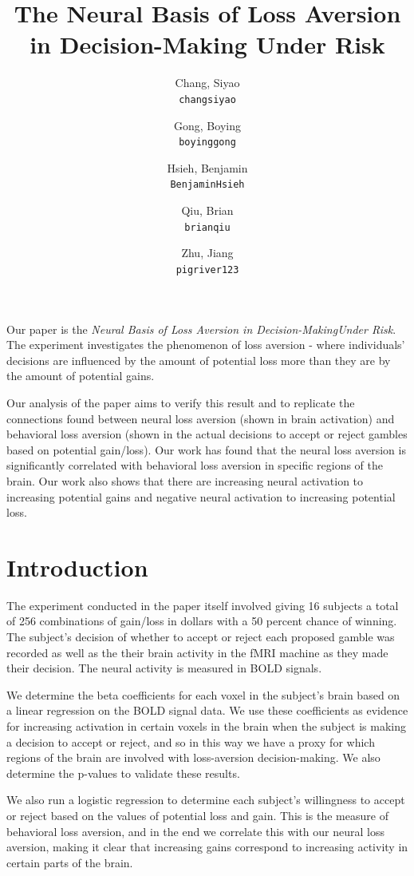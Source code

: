 \documentclass[11pt]{article}
\title{The Neural Basis of Loss Aversion in Decision-Making Under Risk}
\author{
  Chang, Siyao \\
  \texttt{changsiyao}
  \and
  Gong, Boying\\
  \texttt{boyinggong}
  \and
  Hsieh, Benjamin\\
  \texttt{BenjaminHsieh}
  \and
  Qiu, Brian\\
  \texttt{brianqiu}
  \and
  Zhu, Jiang\\
  \texttt{pigriver123}
}
\begin{document}
\maketitle

\par Our paper is the \textit{Neural Basis of Loss Aversion in 
Decision-MakingUnder Risk}.
The experiment investigates the 
phenomenon of loss aversion - where individuals' decisions are influenced by 
the amount of potential loss more than they are by the amount of potential 
gains. 

\par 
Our analysis of the paper aims to verify this result and to replicate the 
connections found between neural loss aversion (shown in brain activation) and 
behavioral loss aversion (shown in the actual decisions to accept or reject 
gambles based on potential gain/loss). Our work has found that the neural loss 
aversion is significantly correlated with behavioral loss aversion in specific 
regions of the brain. Our work also shows that there are increasing neural 
activation to increasing potential gains and negative neural activation to 
increasing potential loss.

\section{Introduction}
The experiment conducted in the paper itself involved giving 16 subjects a 
total of 256 combinations of gain/loss in dollars with a 50 percent chance of 
winning. The subject's decision of whether to accept or reject each proposed 
gamble was recorded as well as the their brain activity in the fMRI machine as 
they made their decision. The neural activity is measured in BOLD signals.

\par 
We determine the beta coefficients for each voxel in the subject's brain based 
on a linear regression on the BOLD signal data. We use these coefficients as 
evidence for increasing activation in certain voxels in the brain when the 
subject is making a decision to accept or reject, and so in this way we have a 
proxy for which regions of the brain are involved with loss-aversion 
decision-making. We also determine the p-values to validate these results.

\par 
We also run a logistic regression to determine each subject's willingness to 
accept or reject based on the values of potential loss and gain. This is the 
measure of behavioral loss aversion, and in the end we correlate this with our 
neural loss aversion, making it clear that increasing gains correspond to 
increasing activity in certain parts of the brain.  
\end{document}
